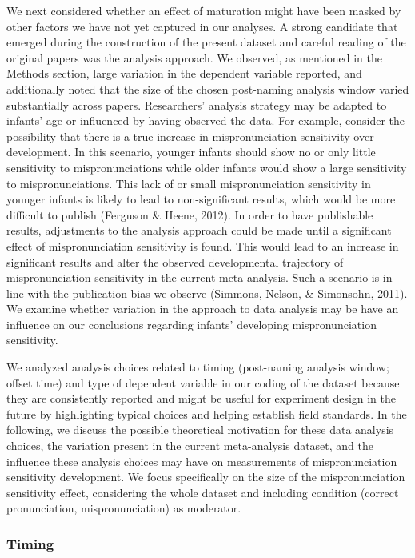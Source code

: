 \documentclass[man]{apa6}
\begin{document}
We next considered whether an effect of maturation might have been masked by other factors we have not yet captured in our analyses. A strong candidate that emerged during the construction of the present dataset and careful reading of the original papers was the analysis approach. We observed, as mentioned in the Methods section, large variation in the dependent variable reported, and additionally noted that the size of the chosen post-naming analysis window varied substantially across papers. Researchers' analysis strategy may be adapted to infants' age or influenced by having observed the data. For example, consider the possibility that there is a true increase in mispronunciation sensitivity over development. In this scenario, younger infants should show no or only little sensitivity to mispronunciations while older infants would show a large sensitivity to mispronunciations. This lack of or small mispronunciation sensitivity in younger infants is likely to lead to non-significant results, which would be more difficult to publish (Ferguson \& Heene, 2012). In order to have publishable results, adjustments to the analysis approach could be made until a significant effect of mispronunciation sensitivity is found. This would lead to an increase in significant results and alter the observed developmental trajectory of mispronunciation sensitivity in the current meta-analysis. Such a scenario is in line with the publication bias we observe (Simmons, Nelson, \& Simonsohn, 2011). We examine whether variation in the approach to data analysis may be have an influence on our conclusions regarding infants' developing mispronunciation sensitivity.

We analyzed analysis choices related to timing (post-naming analysis window; offset time) and type of dependent variable in our coding of the dataset because they are consistently reported and might be useful for experiment design in the future by highlighting typical choices and helping establish field standards. In the following, we discuss the possible theoretical motivation for these data analysis choices, the variation present in the current meta-analysis dataset, and the influence these analysis choices may have on measurements of mispronunciation sensitivity development. We focus specifically on the size of the mispronunciation sensitivity effect, considering the whole dataset and including condition (correct pronunciation, mispronunciation) as moderator.

\hypertarget{timing}{%
\subsubsection{Timing}\label{timing}}
\end{document}
